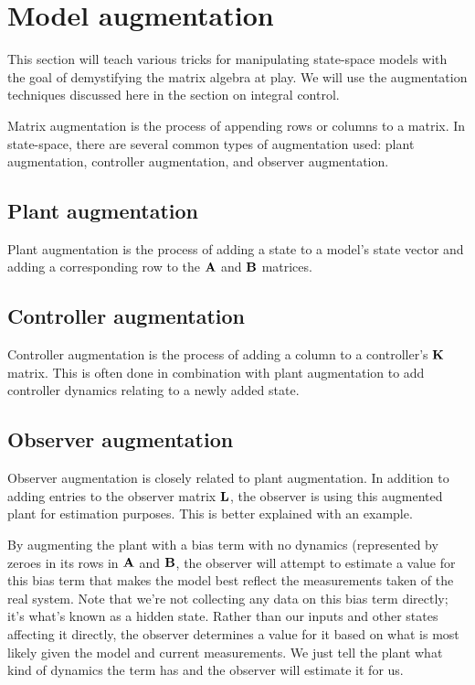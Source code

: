 \section{Model augmentation}

This section will teach various tricks for manipulating state-space models with
the goal of demystifying the matrix algebra at play. We will use the
augmentation techniques discussed here in the section on integral control.

Matrix augmentation is the process of appending rows or columns to a matrix. In
state-space, there are several common types of augmentation used: plant
augmentation, controller augmentation, and observer augmentation.

\subsection{Plant augmentation}

Plant augmentation is the process of adding a state to a model's state vector
and adding a corresponding row to the $\mathbf{A}$ and $\mathbf{B}$ matrices.

\subsection{Controller augmentation}

Controller augmentation is the process of adding a column to a controller's
$\mathbf{K}$ matrix. This is often done in combination with plant augmentation to
add controller dynamics relating to a newly added state.

\subsection{Observer augmentation}

Observer augmentation is closely related to plant augmentation. In addition to
adding entries to the observer matrix $\mathbf{L}$, the observer is using this
augmented plant for estimation purposes. This is better explained with an
example.

By augmenting the plant with a bias term with no dynamics (represented by zeroes
in its rows in $\mathbf{A}$ and $\mathbf{B}$, the observer will attempt to estimate a
value for this bias term that makes the model best reflect the measurements
taken of the real system. Note that we're not collecting any data on this bias
term directly; it's what's known as a hidden state. Rather than our inputs and
other states affecting it directly, the observer determines a value for it based
on what is most likely given the model and current measurements. We just tell
the plant what kind of dynamics the term has and the observer will estimate it
for us.

